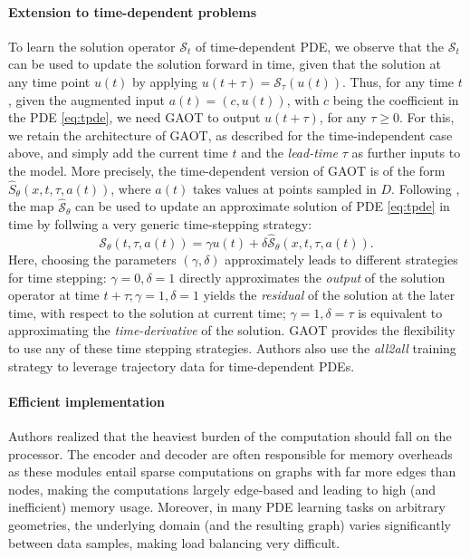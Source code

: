 \documentclass[reqno,10pt]{amsart}
\theoremstyle{plain}
\theoremstyle{definition}
\newcommand{\cal}[1]{\mathcal{#1}}
\begin{document}
\paragraph{\bf Extension to time-dependent problems} 
To learn the solution operator $\cal S_t$ of time-dependent PDE, we observe that the $\cal S_t$ can be used to update the solution forward in time, given that the solution at any time point $ u(t)$ by applying $u(t+\tau)=\cal S_\tau(u(t))$. Thus, for any time $t$, given the augmented input $a(t) = (c,u(t))$, with $c$ being the coefficient in the PDE \ref{eq:tpde}, we need GAOT to output $u(t+\tau)$, for any $\tau \geq 0$. For this, we retain the architecture of GAOT, as described for the time-independent case above, and simply add the current time $t$ and the {\it lead-time} $\tau$ as further inputs to the model. More precisely, the time-dependent version of GAOT is of the form $\hat{S}_\theta(x,t,\tau,a(t))$, where $a(t)$ takes values at points sampled in $D$. Following \cite{SM2025}, the map $\hat{\cal S}_\theta$ can be used to update an approximate solution of PDE \ref{eq:tpde} in time by follwing a very generic time-stepping strategy:
\begin{equation}
    \cal S_\theta(t,\tau,a(t)) = \gamma u(t) + \delta \hat{\cal S}_\theta(x,t,\tau, a(t)).
\end{equation} 
Here, choosing the parameters $(\gamma, \delta)$ approximately leads to different strategies for time stepping: $\gamma = 0, \delta =1$ directly approximates the {\it output} of the solution operator at time $t+\tau; \gamma = 1, \delta = 1$ yields the {\it residual} of the solution at the later time, with respect to the solution at current time; $\gamma = 1, \delta = \tau$ is equivalent to approximating the {\it time-derivative} of the solution. GAOT provides the flexibility to use any of these time stepping strategies. Authors also use the {\it all2all} training strategy \cite{MH2024} to leverage trajectory data for time-dependent PDEs.

\paragraph{\bf Efficient implementation} Authors realized that the heaviest burden of the computation should fall on the processor. The encoder and decoder are often responsible for memory overheads as these modules entail sparse computations on graphs with far more edges than nodes, making the computations largely edge-based and leading to high (and inefficient) memory usage.  Moreover, in many PDE learning tasks on arbitrary geometries, the underlying domain (and the resulting graph) varies significantly between data samples, making load balancing very difficult.
\end{document}
